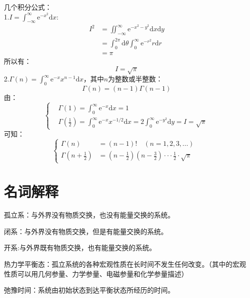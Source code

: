 \documentclass[12pt]{article}
\begin{document}
几个积分公式：\\
1.$I=\int_{-\infty}^{\infty}\mathrm{e}^{-x^2}\mathrm{d}x$:
\begin{equation}
	\begin{split}
	I^2&=\iint_{-\infty}^{\infty}\mathrm{e}^{-x^2-y^2}\mathrm{d}x\mathrm{d}y \\
	&=\int_{0}^{2\pi}\mathrm{d}\theta\int_{0}^{\infty}\mathrm{e}^{-r^2}r\mathrm{d}r\\
	&=\pi
\end{split}
\end{equation}
所以有：
\begin{equation}
	I=\sqrt{\pi}
\end{equation}
2.$\Gamma(n)=\int_{0}^{\infty}\mathrm{e}^{-x}x^{n-1}\mathrm{d}x$，其中$n$为整数或半整数：
\begin{equation}
	\Gamma(n)=(n-1)\Gamma(n-1)
\end{equation}
由：
\begin{equation}
	\left\{\begin{split}
&\Gamma(1)=\int_{0}^{\infty}\mathrm{e}^{-x}\mathrm{d}x=1\\
&\Gamma(\frac{1}{2})=\int_{0}^{\infty}\mathrm{e}^{-x}x^{-1/2}\mathrm{d}x=2\int_{0}^{\infty}	\mathrm{e}^{-y^2}\mathrm{d}y=I=\sqrt{\pi}
\end{split}\right.
\end{equation}
可知：
\begin{equation}
	\left\{\begin{split}
		\Gamma(n)&=(n-1)!\quad (n=1,2,3,...)\\
		\Gamma(n+\frac{1}{2})&=(n-\frac{1}{2})(n-\frac{3}{2})\cdot\cdot\cdot\frac{1}{2}\cdot\sqrt{\pi}\quad
	\end{split}
	\right.
\end{equation}



\newpage
\section{名词解释}
\noindent
孤立系：与外界没有物质交换，也没有能量交换的系统。

\noindent
闭系：与外界没有物质交换，但是有能量交换的系统。

\noindent
开系:与外界既有物质交换，也有能量交换的系统。

\noindent
热力学平衡态：孤立系统的各种宏观性质在长时间不发生任何改变。（其中的宏观性质可以用几何参量、力学参量、电磁参量和化学参量描述）

\noindent
弛豫时间：系统由初始状态到达平衡状态所经历的时间。
\end{document}
